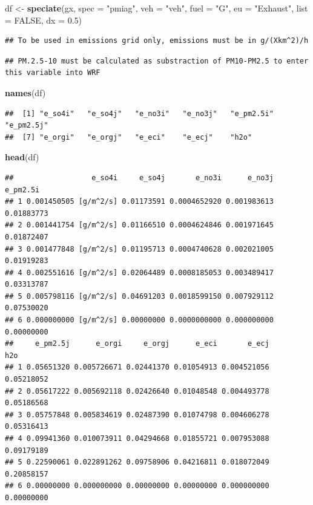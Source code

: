\documentclass[12pt,graybox,envcountchap,sectrefs]{krantz}
\makeatletter
\newenvironment{Shaded}{\begin{snugshade}}{\end{snugshade}}
\newcommand{\KeywordTok}[1]{\textcolor[rgb]{0.13,0.29,0.53}{\textbf{#1}}}
\newcommand{\DataTypeTok}[1]{\textcolor[rgb]{0.13,0.29,0.53}{#1}}
\newcommand{\FloatTok}[1]{\textcolor[rgb]{0.00,0.00,0.81}{#1}}
\newcommand{\StringTok}[1]{\textcolor[rgb]{0.31,0.60,0.02}{#1}}
\newcommand{\OtherTok}[1]{\textcolor[rgb]{0.56,0.35,0.01}{#1}}
\newcommand{\NormalTok}[1]{#1}
\newenvironment{kframe}{%
\medskip{}
\setlength{\fboxsep}{.8em}
 \def\at@end@of@kframe{}%
 \ifinner\ifhmode%
  \def\at@end@of@kframe{\end{minipage}}%
  \begin{minipage}{\columnwidth}%
 \fi\fi%
 \def\FrameCommand##1{\hskip\@totalleftmargin \hskip-\fboxsep
 \colorbox{shadecolor}{##1}\hskip-\fboxsep
     \hskip-\linewidth \hskip-\@totalleftmargin \hskip\columnwidth}%
 \MakeFramed {\advance\hsize-\width
   \@totalleftmargin\z@ \linewidth\hsize
   \@setminipage}}%
 {\par\unskip\endMakeFramed%
 \at@end@of@kframe}
\renewenvironment{Shaded}{\begin{kframe}}{\end{kframe}}
\theoremstyle{definition}
\theoremstyle{definition}
\theoremstyle{definition}
\theoremstyle{remark}
\makeatother
\begin{document}
\begin{Shaded}
\begin{Highlighting}[]
\NormalTok{df <-}\StringTok{ }\KeywordTok{speciate}\NormalTok{(gx, }\DataTypeTok{spec =} \StringTok{"pmiag"}\NormalTok{, }\DataTypeTok{veh =} \StringTok{"veh"}\NormalTok{, }\DataTypeTok{fuel =} \StringTok{"G"}\NormalTok{,}
               \DataTypeTok{eu =} \StringTok{"Exhaust"}\NormalTok{, }\DataTypeTok{list =} \OtherTok{FALSE}\NormalTok{, }\DataTypeTok{dx =} \FloatTok{0.5}\NormalTok{)}
\end{Highlighting}
\end{Shaded}

\begin{verbatim}
## To be used in emissions grid only, emissions must be in g/(Xkm^2)/h
\end{verbatim}

\begin{verbatim}
## PM.2.5-10 must be calculated as substraction of PM10-PM2.5 to enter this variable into WRF
\end{verbatim}

\begin{Shaded}
\begin{Highlighting}[]
\KeywordTok{names}\NormalTok{(df)}
\end{Highlighting}
\end{Shaded}

\begin{verbatim}
##  [1] "e_so4i"   "e_so4j"   "e_no3i"   "e_no3j"   "e_pm2.5i" "e_pm2.5j"
##  [7] "e_orgi"   "e_orgj"   "e_eci"    "e_ecj"    "h2o"
\end{verbatim}

\begin{Shaded}
\begin{Highlighting}[]
\KeywordTok{head}\NormalTok{(df)}
\end{Highlighting}
\end{Shaded}

\begin{verbatim}
##                  e_so4i     e_so4j       e_no3i      e_no3j   e_pm2.5i
## 1 0.001450505 [g/m^2/s] 0.01173591 0.0004652920 0.001983613 0.01883773
## 2 0.001441754 [g/m^2/s] 0.01166510 0.0004624846 0.001971645 0.01872407
## 3 0.001477848 [g/m^2/s] 0.01195713 0.0004740628 0.002021005 0.01919283
## 4 0.002551616 [g/m^2/s] 0.02064489 0.0008185053 0.003489417 0.03313787
## 5 0.005798116 [g/m^2/s] 0.04691203 0.0018599150 0.007929112 0.07530020
## 6 0.000000000 [g/m^2/s] 0.00000000 0.0000000000 0.000000000 0.00000000
##     e_pm2.5j      e_orgi     e_orgj      e_eci       e_ecj        h2o
## 1 0.05651320 0.005726671 0.02441370 0.01054913 0.004521056 0.05218052
## 2 0.05617222 0.005692118 0.02426640 0.01048548 0.004493778 0.05186568
## 3 0.05757848 0.005834619 0.02487390 0.01074798 0.004606278 0.05316413
## 4 0.09941360 0.010073911 0.04294668 0.01855721 0.007953088 0.09179189
## 5 0.22590061 0.022891262 0.09758906 0.04216811 0.018072049 0.20858157
## 6 0.00000000 0.000000000 0.00000000 0.00000000 0.000000000 0.00000000
\end{verbatim}
\end{document}
